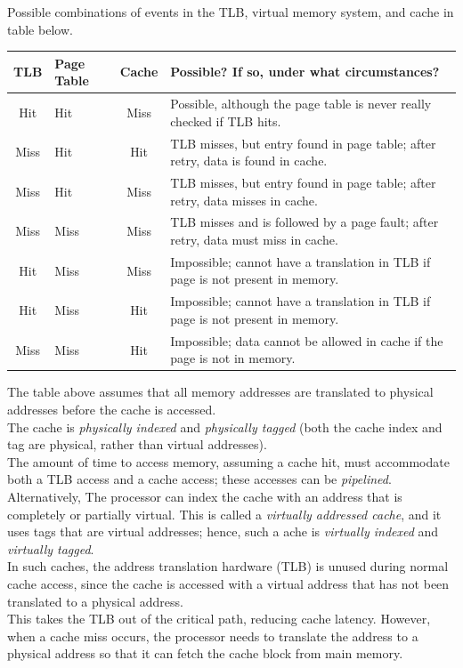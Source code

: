 \documentclass[12pt]{article}
\theoremstyle{definition}
\begin{document}
  Possible combinations of events in the TLB, virtual memory system, and cache in table below.
  \begin{center}
  \begin{tabular}{| c | C{1cm} | c | C{8cm} |}
  \hline
  TLB & Page Table & Cache & Possible? If so, under what circumstances? \\
  \hline
  Hit & Hit & Miss & Possible, although the page table is never really checked if TLB hits. \\
  \hline
  Miss & Hit & Hit & TLB misses, but entry found in page table; after retry, data is found in cache. \\
  \hline
  Miss & Hit & Miss & TLB misses, but entry found in page table; after retry, data misses in cache. \\
  \hline
  Miss & Miss & Miss & TLB misses and is followed by a page fault; after retry, data must miss in cache. \\
  \hline
  Hit & Miss & Miss & Impossible; cannot have a translation in TLB if page is not present in memory. \\
  \hline
  Hit & Miss & Hit & Impossible; cannot have a translation in TLB if page is not present in memory. \\
  \hline
  Miss & Miss & Hit & Impossible; data cannot be allowed in cache if the page is not in memory. \\
  \hline
  \end{tabular}
  \end{center}

  The table above assumes that all memory addresses are translated to physical addresses before the cache is accessed. \\
  The cache is \emph{physically indexed} and \emph{physically tagged} (both the cache index and tag are physical, rather than virtual addresses). \\
  The amount of time to access memory, assuming a cache hit, must accommodate both a TLB access and a cache access;
  these accesses can be \emph{pipelined}. \\

  Alternatively, The processor can index the cache with an address that is completely or partially virtual.
  This is called a \emph{virtually addressed cache}, and it uses tags that are virtual addresses;
  hence, such a ache is \emph{virtually indexed} and \emph{virtually tagged}. \\
  In such caches, the address translation hardware (TLB) is unused during normal cache access, since the cache is accessed with a virtual address that has not been translated to a physical address. \\
  This takes the TLB out of the critical path, reducing cache latency.
  However, when a cache miss occurs, the processor needs to translate the address to a physical address so that it can fetch the cache block from main memory. \\
\end{document}
